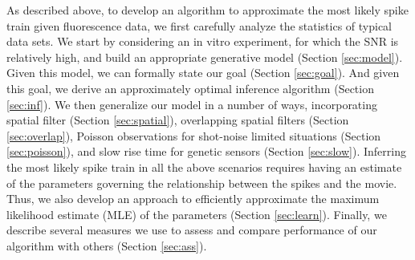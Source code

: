 As described above, to develop an algorithm to approximate the most likely spike train given fluorescence data, we first carefully analyze the statistics of typical data sets.  We start by considering an in vitro experiment, for which the SNR is relatively high, and build an appropriate generative model (Section \ref{sec:model}).  Given this model, we can formally state our goal (Section \ref{sec:goal}).  And given this goal, we derive an approximately optimal inference algorithm (Section \ref{sec:inf}).  We then generalize our model in a number of ways, incorporating spatial filter (Section \ref{sec:spatial}), overlapping spatial filters (Section \ref{sec:overlap}), Poisson observations for shot-noise limited situations (Section \ref{sec:poisson}), and slow rise time for genetic sensors (Section \ref{sec:slow}).  Inferring the most likely spike train in all the above scenarios requires having an estimate of the parameters governing the relationship between the spikes and the movie.  Thus, we also develop an approach to efficiently approximate the maximum likelihood estimate (MLE) of the parameters (Section \ref{sec:learn}).  Finally, we describe several measures we use to assess and compare performance of our algorithm with others (Section \ref{sec:ass}).    
